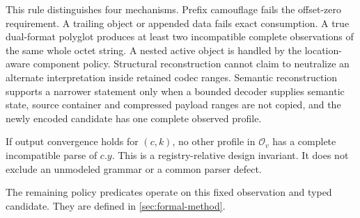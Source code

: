 This rule distinguishes four mechanisms. Prefix camouflage fails the
offset-zero requirement. A trailing object or appended data fails exact
consumption. A true dual-format polyglot produces at least two incompatible
complete observations of the same whole octet string. A nested active object is
handled by the location-aware component policy. Structural reconstruction
cannot claim to neutralize an alternate interpretation inside retained codec
ranges. Semantic reconstruction supports a narrower statement only when a
bounded decoder supplies semantic state, source container and compressed
payload ranges are not copied, and the newly encoded candidate has one complete
observed profile.

\begin{property}
\label{prop:unique-output-profile}
If output convergence holds for $(c,k)$, no other profile in $\mathcal{O}_v$
has a complete incompatible parse of $c.y$. This is a registry-relative design
invariant. It does not exclude an unmodeled grammar or a common parser defect.
\end{property}

The remaining policy predicates operate on this fixed observation and typed
candidate. They are defined in \cref{sec:formal-method}.
